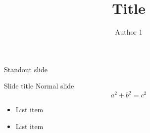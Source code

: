 \documentclass{beamer}
\title{Title}
\author{Author 1\inst{1}}
\institute[]{
    \inst{1}%
    Department of Something\\
    University of Somewhere
}
\date{}
\begin{document}
\begin{frame}
  \titlepage
\end{frame}

\begin{frame}{} 
Standout slide
\end{frame}

\begin{frame}{Slide title}
Normal slide
$$a^2 + b^2 = c^2$$
\begin{itemize}
	\item List item
	\item List item
\end{itemize}
\end{frame}

% 	
\end{document}
